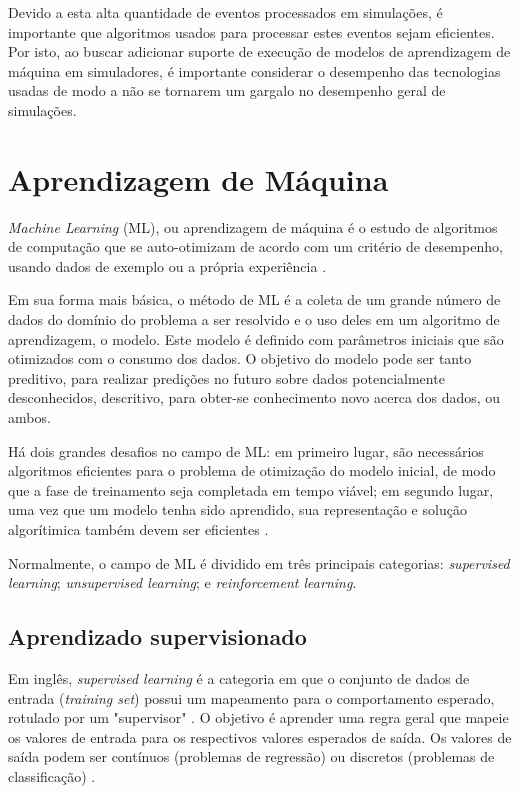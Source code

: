 Devido a esta alta quantidade de eventos processados em simulações, é importante que algoritmos usados para processar estes eventos sejam eficientes. Por isto, ao buscar adicionar suporte de execução de modelos de aprendizagem de máquina em simuladores, é importante considerar o desempenho das tecnologias usadas de modo a não se tornarem um gargalo no desempenho geral de simulações.

\section{Aprendizagem de Máquina}
\label{ml}

\textit{Machine Learning} (ML), ou aprendizagem de máquina é o estudo de algoritmos de computação que se auto-otimizam de acordo com um critério de desempenho, usando dados de exemplo ou a própria experiência \cite{mitchell1997ml, alpaydin2020introduction}.

Em sua forma mais básica, o método de ML é a coleta de um grande número de dados do domínio do problema a ser resolvido e o uso deles em um algoritmo de aprendizagem, o modelo. Este modelo é definido com parâmetros iniciais que são otimizados com o consumo dos dados. O objetivo do modelo pode ser tanto preditivo, para realizar predições no futuro sobre dados potencialmente desconhecidos, descritivo, para obter-se conhecimento novo acerca dos dados, ou ambos.

Há dois grandes desafios no campo de ML: em primeiro lugar, são necessários algoritmos eficientes para o problema de otimização do modelo inicial, de modo que a fase de treinamento seja completada em tempo viável; em segundo lugar, uma vez que um modelo tenha sido aprendido, sua representação e solução algorítimica também devem ser eficientes \cite{alpaydin2020introduction, brief_introduction_to_ml}.

Normalmente, o campo de ML é dividido em três principais categorias: \textit{supervised learning}; \textit{unsupervised learning}; e \textit{reinforcement learning}.

\subsection{Aprendizado supervisionado}

Em inglês, \textit{supervised learning} é a categoria em que o conjunto de dados de entrada (\textit{training set}) possui um mapeamento para o comportamento esperado, rotulado por um "supervisor" \cite{alpaydin2020introduction}. O objetivo é aprender uma regra geral que mapeie os valores de entrada para os respectivos valores esperados de saída. Os valores de saída podem ser contínuos (problemas de regressão) ou discretos (problemas de classificação) \cite{8527529}.

